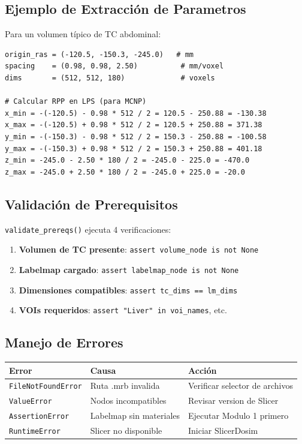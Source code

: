 \documentclass[12pt,a4paper]{article}
\begin{document}

\subsection{Ejemplo de Extracción de Parametros}

Para un volumen típico de TC abdominal:

\begin{lstlisting}
origin_ras = (-120.5, -150.3, -245.0)   # mm
spacing    = (0.98, 0.98, 2.50)          # mm/voxel
dims       = (512, 512, 180)             # voxels

# Calcular RPP en LPS (para MCNP)
x_min = -(-120.5) - 0.98 * 512 / 2 = 120.5 - 250.88 = -130.38
x_max = -(-120.5) + 0.98 * 512 / 2 = 120.5 + 250.88 = 371.38
y_min = -(-150.3) - 0.98 * 512 / 2 = 150.3 - 250.88 = -100.58
y_max = -(-150.3) + 0.98 * 512 / 2 = 150.3 + 250.88 = 401.18
z_min = -245.0 - 2.50 * 180 / 2 = -245.0 - 225.0 = -470.0
z_max = -245.0 + 2.50 * 180 / 2 = -245.0 + 225.0 = -20.0
\end{lstlisting}

\subsection{Validación de Prerequisitos}

\texttt{validate\_prereqs()} ejecuta 4 verificaciones:

\begin{enumerate}
    \item \textbf{Volumen de TC presente}: \texttt{assert volume\_node is not None}
    \item \textbf{Labelmap cargado}: \texttt{assert labelmap\_node is not None}
    \item \textbf{Dimensiones compatibles}: \texttt{assert tc\_dims == lm\_dims}
    \item \textbf{VOIs requeridos}: \texttt{assert "Liver" in voi\_names}, etc.
\end{enumerate}

\subsection{Manejo de Errores}

\begin{center}
\begin{tabular}{lll}
\toprule
\textbf{Error} & \textbf{Causa} & \textbf{Acción} \\
\midrule
\texttt{FileNotFoundError} & Ruta .mrb invalida & Verificar selector de archivos \\
\texttt{ValueError} & Nodos incompatibles & Revisar version de Slicer \\
\texttt{AssertionError} & Labelmap sin materiales & Ejecutar Modulo 1 primero \\
\texttt{RuntimeError} & Slicer no disponible & Iniciar SlicerDosim \\
\bottomrule
\end{tabular}
\end{center}
\end{document}
